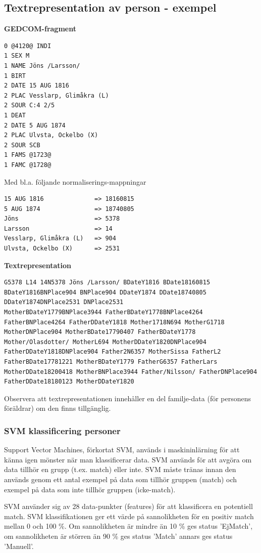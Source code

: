 \documentclass[swedish,11pt]{article}
\begin{document}
\subsection{Textrepresentation av person - exempel}\label{textrepr}

{\bf GEDCOM-fragment}
\begin{verbatim}
0 @4120@ INDI
1 SEX M
1 NAME Jöns /Larsson/
1 BIRT
2 DATE 15 AUG 1816
2 PLAC Vesslarp, Glimåkra (L)
2 SOUR C:4 2/5
1 DEAT
2 DATE 5 AUG 1874
2 PLAC Ulvsta, Ockelbo (X)
2 SOUR SCB
1 FAMS @1723@
1 FAMC @1728@
\end{verbatim}

Med bl.a. följande normaliserings-mappningar
\begin{verbatim}
15 AUG 1816              => 18160815
5 AUG 1874               => 18740805
Jöns                     => 5378
Larsson                  => 14
Vesslarp, Glimåkra (L)   => 904
Ulvsta, Ockelbo (X)      => 2531
\end{verbatim}

{\bf Textrepresentation}
\begin{verbatim}
G5378 L14 14N5378 Jöns /Larsson/ BDateY1816 BDate18160815
BDateY1816BNPlace904 BNPlace904 DDateY1874 DDate18740805
DDateY1874DNPlace2531 DNPlace2531
MotherBDateY1779BNPlace3944 FatherBDateY1778BNPlace4264
FatherBNPlace4264 FatherDDateY1818 Mother1718N694 MotherG1718
MotherDNPlace904 MotherBDate17790407 FatherBDateY1778
Mother/Olasdotter/ MotherL694 MotherDDateY1820DNPlace904
FatherDDateY1818DNPlace904 Father2N6357 MotherSissa FatherL2
FatherBDate17781221 MotherBDateY1779 FatherG6357 FatherLars
MotherDDate18200418 MotherBNPlace3944 Father/Nilsson/ FatherDNPlace904
FatherDDate18180123 MotherDDateY1820
\end{verbatim}
Observera att textrepresentationen innehåller en del familje-data (för
personens föräldrar) om den finns tillgänglig.

\subsubsection{SVM klassificering personer}\label{svm}
Support Vector Machines, förkortat SVM,
används i maskininlärning för att känna igen mönster när man klassificerar
data. SVM används för att avgöra om data tillhör en grupp
(t.ex. match) eller inte.
SVM måste tränas innan den används genom ett antal exempel på data som
tillhör gruppen (match) och exempel på data som inte tillhör gruppen (icke-match).

SVM använder sig av 28 data-punkter (features) för att klassificera en
potentiell match. SVM klassifikationen ger ett värde på sannolikheten
för en positiv match mellan 0 och 100 \%. Om sannolikheten är mindre
än 10 \% ges status 'EjMatch', om sannolikheten är störren än 90 \%
ges status 'Match' annars ges status 'Manuell'.
\end{document}
